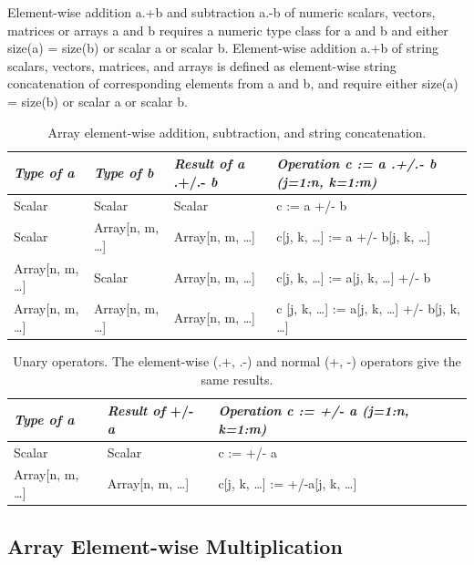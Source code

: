 \documentclass[10pt,a4paper]{report}
\def\doublelabel#1{\label{#1}}
\begin{document}
Element-wise addition a.+b and subtraction a.-b of numeric scalars,
vectors, matrices or arrays a and b requires a numeric type class for a
and b and either size(a) = size(b) or scalar a or scalar b. Element-wise
addition a.+b of string scalars, vectors, matrices, and arrays is
defined as element-wise string concatenation of corresponding elements
from a and b, and require either size(a) = size(b) or scalar a or scalar
b.

\begin{longtable}[]{|l|l|l|l|}
\caption{Array element-wise addition, subtraction, and string concatenation.}\\
\hline
\emph{Type of a} & \emph{Type of b} & \emph{Result of a} .+/.- \emph{b}
& \emph{Operation c := a .+/.- b (j=1:n, k=1:m)}\\ \hline
\endhead
Scalar & Scalar & Scalar & c := a +/- b\\ \hline
Scalar & Array{[}n, m, \ldots{}{]} & Array{[}n, m, \ldots{}{]} & c{[}j,
k, \ldots{}{]} := a +/- b{[}j, k, \ldots{}{]}\\ \hline
Array{[}n, m, \ldots{}{]} & Scalar & Array{[}n, m, \ldots{}{]} & c{[}j,
k, \ldots{}{]} := a{[}j, k, \ldots{}{]} +/- b\\ \hline
Array{[}n, m, \ldots{}{]} & Array{[}n, m, \ldots{}{]} & Array{[}n, m,
\ldots{}{]} & c {[}j, k, \ldots{}{]} := a{[}j, k, \ldots{}{]} +/- b{[}j,
k, \ldots{}{]}\\ \hline

\end{longtable}

\begin{longtable}[]{|l|l|l|}
\caption{Unary operators. The element-wise (.+, .-) and normal (+, -) operators give the same results.}\\
\hline
\emph{Type of a} & \emph{Result of} +/- \emph{a} & \emph{Operation c :=
+/- a (j=1:n, k=1:m)}\\ \hline
\endhead
Scalar & Scalar & c := +/- a\\ \hline
Array{[}n, m, \ldots{}{]} & Array{[}n, m, \ldots{}{]} & c{[}j, k,
\ldots{}{]} := +/-a{[}j, k, \ldots{}{]}\\ \hline

\end{longtable}

\subsection{Array Element-wise Multiplication}\doublelabel{array-element-wise-multiplication}
\end{document}
